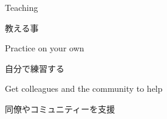 \documentclass{beamer}
\begin{document}
  \begin{frame}
   
   \begin{center}
   
   \LARGE{Teaching}\\
   \LARGE{\begin{CJK}{UTF8}{min}教える事\end{CJK}}
   
   \end{center}

  \end{frame}
  \begin{frame}
   
   \begin{center}
   
   \LARGE{Practice on your own}\\
   \LARGE{\begin{CJK}{UTF8}{min}自分で練習する\end{CJK}}
   
   \end{center}

  \end{frame}  
    \begin{frame}
   
   \begin{center}
   
   \LARGE{Get colleagues and the community to help}\\
   \LARGE{\begin{CJK}{UTF8}{min}同僚やコミュニティーを支援\end{CJK}}
   
   \end{center}

  \end{frame}
\end{document}
